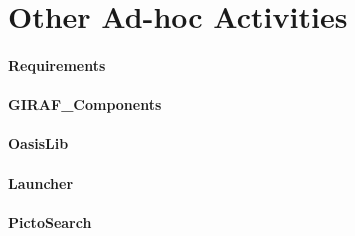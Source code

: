 \section{Other Ad-hoc Activities}\label{sec:adhoc}

\paragraph{Requirements}

\paragraph{GIRAF\_Components}

\paragraph{OasisLib}

\paragraph{Launcher}

\paragraph{PictoSearch}